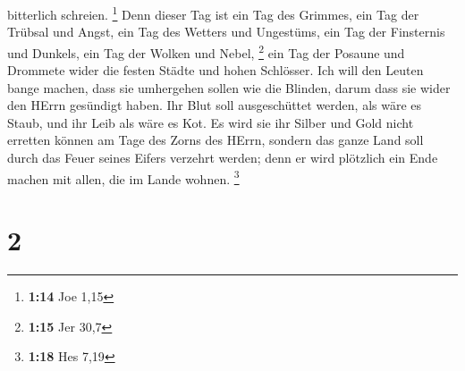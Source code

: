 bitterlich schreien. \footnote{\textbf{1:14} Joe 1,15} 
Denn dieser Tag ist ein Tag des Grimmes, ein Tag der Trübsal und Angst,
ein Tag des Wetters und Ungestüms, ein Tag der Finsternis und Dunkels,
ein Tag der Wolken und Nebel, \footnote{\textbf{1:15} Jer 30,7}
 ein Tag der Posaune und Drommete wider die festen Städte
und hohen Schlösser.  Ich will den Leuten bange machen,
dass sie umhergehen sollen wie die Blinden, darum dass sie wider den
HErrn gesündigt haben. Ihr Blut soll ausgeschüttet werden, als wäre es
Staub, und ihr Leib als wäre es Kot.  Es wird sie ihr
Silber und Gold nicht erretten können am Tage des Zorns des HErrn,
sondern das ganze Land soll durch das Feuer seines Eifers verzehrt
werden; denn er wird plötzlich ein Ende machen mit allen, die im Lande
wohnen. \footnote{\textbf{1:18} Hes 7,19}

\hypertarget{section-1}{%
\section{2}\label{section-1}}

